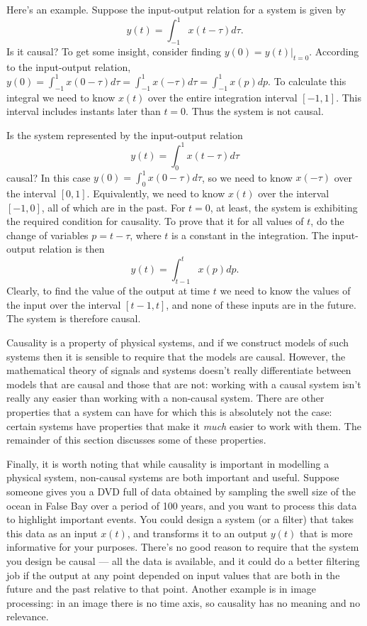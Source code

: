 \documentclass[10pt]{beamer}
\begin{document}
Here's an example.  Suppose the input-output relation for a system is given by
\begin{equation*}
  y(t) = \int_{-1}^1 x(t - \tau) d\tau.
\end{equation*}
Is it causal?  To get some insight, consider finding $y(0) = \left. y(t) \right|_{t=0}$.  According to the input-output relation, $y(0) = \int_{-1}^1 x(0 - \tau) d\tau = \int_{-1}^1 x(- \tau) d\tau = \int_{-1}^1 x(p) dp$.  To calculate this integral we need to know $x(t)$ over the entire integration interval $[-1, 1]$.  This interval includes instants later than $t=0$.  Thus the system is not causal.

Is the system represented by the input-output relation
\begin{equation*}
  y(t) = \int_{0}^1 x(t - \tau) d\tau
\end{equation*}
causal?  In this case $y(0) = \int_{0}^1 x(0 - \tau) d\tau$, so we need to know $x(-\tau)$ over the interval $[0, 1]$.  Equivalently, we need to know $x(t)$ over the interval $[-1, 0]$, all of which are in the past.  For $t=0$, at least, the system is exhibiting the required condition for causality.  To prove that it for all values of $t$, do the change of variables $p = t - \tau$, where $t$ is a constant in the integration.  The input-output relation is then 
\begin{equation*}
  y(t) = \int_{t-1}^t x(p) dp.
\end{equation*}
Clearly, to find the value of the output at time $t$ we need to know the values of the input over the interval $[t-1, t]$, and none of these inputs are in the future.  The system is therefore causal.

Causality is a property of physical systems, and if we construct models of such systems then it is sensible to require that the models are causal.  However, the mathematical theory of signals and systems doesn't really differentiate between models that are causal and those that are not:  working with a causal system isn't really any easier than working with a non-causal system.  There are other properties that a system can have for which this is absolutely not the case:  certain systems have properties that make it {\em much} easier to work with them.  The remainder of this section discusses some of these properties.

Finally, it is worth noting that while causality is important in modelling a physical system, non-causal systems are both important and useful.  Suppose someone gives you a DVD full of data obtained by sampling the swell size of the ocean in False Bay over a period of 100 years, and you want to process this data to highlight important events.  You could design a system (or a filter) that takes this data as an input $x(t)$, and transforms it to an output $y(t)$ that is more informative for your purposes.  There's no good reason to require that the system you design be causal --- all the data is available, and it could do a better filtering job if the output at any point depended on input values that are both in the future and the past relative to that point.  Another example is in image processing:  in an image there is no time axis, so causality has no meaning and no relevance.
\end{document}
